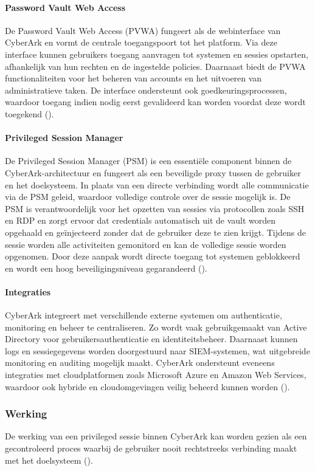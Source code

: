 \paragraph{Password Vault Web Access}
De Password Vault Web Access (PVWA) fungeert als de webinterface van CyberArk en vormt de centrale toegangspoort tot het platform. Via deze interface kunnen gebruikers toegang aanvragen tot systemen en sessies opstarten, afhankelijk van hun rechten en de ingestelde policies. Daarnaast biedt de PVWA functionaliteiten voor het beheren van accounts en het uitvoeren van administratieve taken. De interface ondersteunt ook goedkeuringsprocessen, waardoor toegang indien nodig eerst gevalideerd kan worden voordat deze wordt toegekend (\cite{cyberark_pam_architecture}).
\paragraph{Privileged Session Manager }
De Privileged Session Manager (PSM) is een essentiële component binnen de CyberArk-architectuur en fungeert als een beveiligde proxy tussen de gebruiker en het doelsysteem. In plaats van een directe verbinding wordt alle communicatie via de PSM geleid, waardoor volledige controle over de sessie mogelijk is. De PSM is verantwoordelijk voor het opzetten van sessies via protocollen zoals SSH en RDP en zorgt ervoor dat credentials automatisch uit de vault worden opgehaald en geïnjecteerd zonder dat de gebruiker deze te zien krijgt. Tijdens de sessie worden alle activiteiten gemonitord en kan de volledige sessie worden opgenomen. Door deze aanpak wordt directe toegang tot systemen geblokkeerd en wordt een hoog beveiligingsniveau gegarandeerd (\cite{cyberark_psm}).
\paragraph{Integraties}
CyberArk integreert met verschillende externe systemen om authenticatie, monitoring en beheer te centraliseren. Zo wordt vaak gebruikgemaakt van Active Directory voor gebruikersauthenticatie en identiteitsbeheer. Daarnaast kunnen logs en sessiegegevens worden doorgestuurd naar SIEM-systemen, wat uitgebreide monitoring en auditing mogelijk maakt. CyberArk ondersteunt eveneens integraties met cloudplatformen zoals Microsoft Azure en Amazon Web Services, waardoor ook hybride en cloudomgevingen veilig beheerd kunnen worden (\cite{cyberark_pam_architecture}).
\subsubsection{Werking}
De werking van een privileged sessie binnen CyberArk kan worden gezien als een gecontroleerd proces waarbij de gebruiker nooit rechtstreeks verbinding maakt met het doelsysteem (\cite{cyberark_psm}).

